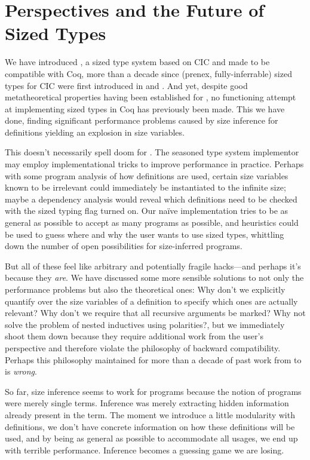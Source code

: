 \section{Perspectives and the Future of Sized Types}
\label{sec:conclusion}

We have introduced \lang, a sized type system based on CIC and made to be compatible with Coq,
more than a decade since (prenex, fully-inferrable) sized types for CIC were first introduced in \CIChat and \CIChatminus.
And yet, despite good metatheoretical properties having been established for \CIChatminus,
no functioning attempt at implementing sized types in Coq has previously been made.
This we have done, finding significant performance problems caused by size inference for definitions yielding an explosion in size variables.

This doesn't necessarily spell doom for \lang.
The seasoned type system implementor may employ implementational tricks to improve performance in practice.
Perhaps with some program analysis of how definitions are used, certain size variables known to be irrelevant could immediately be instantiated to the infinite size;
maybe a dependency analysis would reveal which definitions need to be checked with the sized typing flag turned on.
Our na\"ive implementation tries to be as general as possible to accept as many programs as possible,
and heuristics could be used to guess where and why the user wants to use sized types,
whittling down the number of open possibilities for size-inferred programs.

But all of these feel like arbitrary and potentially fragile hacks---and perhaps it's because they \emph{are}.
We have discussed some more sensible solutions to not only the performance problems but also the theoretical ones:
Why don't we explicitly quantify over the size variables of a definition to specify which ones are actually relevant?
Why don't we require that all recursive arguments be marked?
Why not solve the problem of nested inductives using polarities?,
but we immediately shoot them down because they require additional work from the user's perspective and therefore violate the philosophy of backward compatibility.
Perhaps this philosophy maintained for more than a decade of past work from \lambdahat to \CIChatsub is \emph{wrong}.

So far, size inference seems to work for programs because the notion of programs were merely single terms.
Inference was merely extracting hidden information already present in the term.
The moment we introduce a little modularity with definitions,
we don't have concrete information on how these definitions will be used,
and by being as general as possible to accommodate all usages,
we end up with terrible performance.
Inference becomes a guessing game we are losing.

